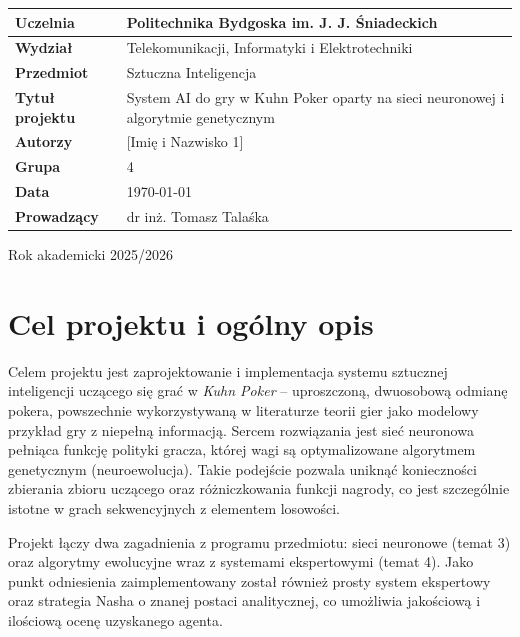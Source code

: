 \documentclass[12pt,a4paper]{article}
\begin{document}
\thispagestyle{empty}
\begin{center}
\begin{tabular}{|p{5cm}|p{9cm}|}
\hline
\textbf{Uczelnia} & Politechnika Bydgoska im. J. J. Śniadeckich \\ \hline
\textbf{Wydział} & Telekomunikacji, Informatyki i Elektrotechniki \\ \hline
\textbf{Przedmiot} & Sztuczna Inteligencja \\ \hline
\textbf{Tytuł projektu} & System AI do gry w Kuhn Poker oparty na sieci neuronowej i algorytmie genetycznym \\ \hline
\textbf{Autorzy} & [Imię i Nazwisko 1]  \\ \hline
\textbf{Grupa} & 4 \\ \hline
\textbf{Data} & \today \\ \hline
\textbf{Prowadzący} & dr inż. Tomasz Talaśka \\ \hline
\end{tabular}
\end{center}
\vfill
\begin{center}
\Large Rok akademicki 2025/2026
\end{center}
\newpage

\section{Cel projektu i ogólny opis}

Celem projektu jest zaprojektowanie i implementacja systemu sztucznej
inteligencji uczącego się grać w \emph{Kuhn Poker} -- uproszczoną,
dwuosobową odmianę pokera, powszechnie wykorzystywaną w literaturze
teorii gier jako modelowy przykład gry z niepełną informacją. Sercem
rozwiązania jest sieć neuronowa pełniąca funkcję polityki gracza, której
wagi są optymalizowane algorytmem genetycznym (neuroewolucja). Takie
podejście pozwala uniknąć konieczności zbierania zbioru uczącego oraz
różniczkowania funkcji nagrody, co jest szczególnie istotne w grach
sekwencyjnych z elementem losowości.

Projekt łączy dwa zagadnienia z programu przedmiotu: sieci neuronowe
(temat 3) oraz algorytmy ewolucyjne wraz z systemami ekspertowymi
(temat 4). Jako punkt odniesienia zaimplementowany został również prosty
system ekspertowy oraz strategia Nasha o znanej postaci analitycznej,
co umożliwia jakościową i ilościową ocenę uzyskanego agenta.
\end{document}
